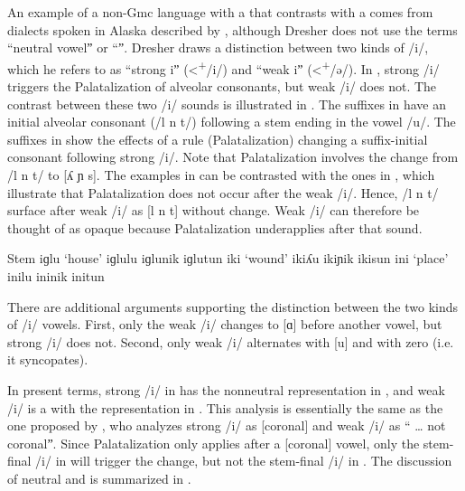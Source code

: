 \begin{xlist}
\begin{xlist}
An example of a non-Gmc language with a  that contrasts with a  comes from  dialects spoken in Alaska described by \citet[166--167]{Dresher2009}, although Dresher does not use the terms “neutral vowelˮ or “ˮ. Dresher draws a distinction between two kinds of /i/, which he refers to as “strong iˮ (<\textsuperscript{+}/i/) and “weak iˮ (<\textsuperscript{+}/ə/). In , strong /i/ triggers the Palatalization of alveolar consonants, but weak /i/ does not. The contrast between these two /i/ sounds is illustrated in . The suffixes in  have an initial alveolar consonant (/l n t/) following a stem ending in the vowel /u/. The suffixes in  show the effects of a rule (Palatalization) changing a suffix-initial consonant following strong /i/. Note that Palatalization involves the change from /l n t/ to [ʎ ɲ s]. The examples in  can be contrasted with the ones in , which illustrate that Palatalization does not occur after the weak /i/. Hence, /l n t/ surface after weak /i/ as [l n t] without change. Weak /i/ can therefore be thought of as opaque because Palatalization underapplies after that sound.

\begin{exe}
\ex%
\label{ex:2:31}
\begin{xlist}
\exi{}  {Stem}    
\ex \label{ex:2:31a} iɡlu \tab ‘house’ \tab iɡlulu \tab iɡlunik \tab iɡlutun
\ex \label{ex:2:31b} iki  \tab ‘wound’ \tab ikiʎu  \tab ikiɲik  \tab ikisun
\ex \label{ex:2:31c} ini  \tab ‘place’ \tab inilu  \tab ininik  \tab initun
\end{xlist}
\end{exe}

There are additional arguments supporting the distinction between the two kinds of /i/ vowels. First, only the weak /i/ changes to [ɑ] before another vowel, but strong /i/ does not. Second, only weak /i/ alternates with [u] and with zero (i.e. it syncopates).

In present terms, strong /i/ in  has the nonneutral representation in , and weak /i/ is a  with the representation in . This analysis is essentially the same as the one proposed by \citet[166]{Dresher2009}, who analyzes strong /i/ as [coronal] and weak /i/ as “ … not coronalˮ. Since Palatalization only applies after a [coronal] vowel, only the stem-final /i/ in  will trigger the change, but not the stem-final /i/ in . The discussion of neutral and  is summarized in .


\end{xlist}
\end{xlist}

